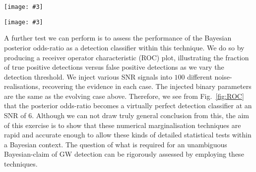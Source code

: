 \documentclass[prd,showpacs,nofootinbib]{revtex4}
\newcommand{\incgraph}[3]{\texttt{[image: \#3]}}
\begin{document}
\begin{figure*}
\incgraph{0}{1.0}{M1p8e8_Fgw2m8_SNR8_MaxPost.pdf}
\caption{\label{fig:MaxPost3}We show the distribution of maximum-a-posteriori values (filled grey circles) from an analysis of $100$ realisations of a weakly evolving signal injected into a Type II dataset, and analysed with the {\bf $\mathcal{M}_p$} statistic. The injected values of $(\mathcal{M},D_L)$ appear to be offset from the distribution of maximum-a-posteriori values which may be consistent with the scatter of those values. }
 \end{figure*}

\begin{figure*}
  \incgraph{0}{0.6}{ROCcurves_M7e8_Fgw2m8.pdf}
   \caption{\label{fig:ROC}We inject an evolving signal into $100$ realisations of Type II datasets at various SNRs (including SNR=0), recovering the posterior-odds ratio via the {\bf $\mathcal{M}_p$} statistic in each case. Setting the threshold of detection at varying values of the posterior odds ratio, we compute the fraction of realisations which are classified as false-positive and true-positive detections. We see that for this binary, and using this technique, the posterior odds ratio is an almost perfect classifier at SNR=6. With these numerical marginalisation techniques, the run-time is fast enough to permit detailed analysis of detection requirements within a Bayesian context.} 
 \end{figure*}

A further test we can perform is to assess the performance of the Bayesian posterior odds-ratio as a detection classifier within this technique. We do so by producing a receiver operator characteristic (ROC) plot, illustrating the fraction of true positive detections versus false positive detections as we vary the detection threshold. We inject various SNR signals into $100$ different noise-realisations, recovering the evidence in each case. The injected binary parameters are the same as the evolving case above. Therefore, we see from Fig.\ \ref{fig:ROC} that the posterior odds-ratio becomes a virtually perfect detection classifier at an SNR of $6$. Although we can not draw truly general conclusion from this, the aim of this exercise is to show that these numerical marginalisation techniques are rapid and accurate enough to allow these kinds of detailed statistical tests within a Bayesian context. The question of what is required for an unambiguous Bayesian-claim of GW detection can be rigorously assessed by employing these techniques.
\end{document}
